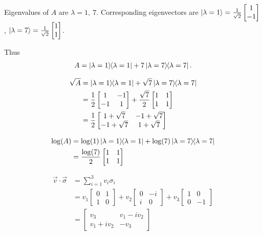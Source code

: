 Eigenvalues of $A$ are $\lambda = 1, ~ 7$.
Corresponding eigenvectors are
$
	\ket{\lambda = 1} = \frac{1}{\sqrt{2}} \begin{bmatrix}
	1 \\
	-1
	\end{bmatrix}
$,
$
	\ket{\lambda = 7} = \frac{1}{\sqrt{2}} \begin{bmatrix}
1 \\
1
\end{bmatrix}
$.

\vspace{5mm}
Thus
\begin{align*}
	A = \ket{\lambda = 1}\hspace{-1mm} \bra{\lambda = 1} + 7 \ket{\lambda = 7}\hspace{-1mm} \bra{\lambda = 7}.
\end{align*}

\begin{align*}
	\sqrt{A} &= \ket{\lambda = 1}\hspace{-1mm} \bra{\lambda = 1} + \sqrt{7} \ket{\lambda = 7}\hspace{-1mm} \bra{\lambda = 7}\\
		&= \frac{1}{2} \begin{bmatrix}
		1 & -1 \\
		-1 & 1
		\end{bmatrix}
		+
		\frac{\sqrt{7}}{2} \begin{bmatrix}
		1 & 1 \\
		1 & 1
		\end{bmatrix}\\
		&=
		\frac{1}{2}
		 \begin{bmatrix}
			1+\sqrt{7} & -1+\sqrt{7} \\
			-1 + \sqrt{7} & 1+\sqrt{7}
		\end{bmatrix}
\end{align*}

 \begin{align*}
 	\log (A) &=  \log (1) \ket{\lambda = 1}\hspace{-1mm} \bra{\lambda = 1} + \log (7) \ket{\lambda = 7}\hspace{-1mm} \bra{\lambda = 7}\\
 		&= \frac{\log (7)}{2} \begin{bmatrix}
	 		1 & 1 \\
	 		1 & 1
 		\end{bmatrix}
 \end{align*}



\begin{align*}
	\vec{v} \cdot \vec{\sigma} &= \sum_{i=1}^3 v_i \sigma_i\\
		&= v_1 \begin{bmatrix}
		0 & 1 \\
		1 & 0
		\end{bmatrix}
		+ v_2 \begin{bmatrix}
		0 & -i \\
		i & 0
		\end{bmatrix}
		+ v_3 \begin{bmatrix}
		1 & 0 \\
		0 & -1
		\end{bmatrix} \\
		&= \begin{bmatrix}
		v_3 & v_1 - i v_2 \\
		v_1 + iv_2 & -v_3
		\end{bmatrix}
\end{align*}

